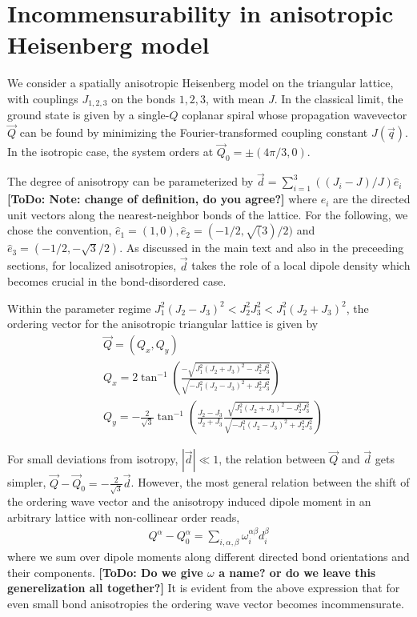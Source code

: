 \documentclass[twocolumn,english,aps,prl,floatfix]{revtex4-1}
\newcommand{\todo}[1]{{\color{red} {\bf [ToDo: #1]}}}
\begin{document}

\section{Incommensurability in anisotropic Heisenberg model}

We consider a spatially anisotropic Heisenberg model on the 
triangular lattice, with couplings $J_{1,2,3}$ on the bonds $1,2,3$, 
with mean $J$. In the classical limit, the ground state is given by 
a single-$Q$ coplanar spiral whose propagation wavevector $\vec Q$ 
can be found by minimizing the Fourier-transformed coupling constant 
$J({\vec q})$. In the isotropic case, the system orders at 
$\vec Q_0 = \pm (4\pi/3,0)$.

The degree of anisotropy can be parameterized by 
$\vec{d} = \sum_{i=1}^3 ((J_i-J)/J) \hat{e}_i$ 
\todo{Note: change of definition, do you agree?}
where $\hat{e}_i$ are the 
directed unit vectors along the nearest-neighbor bonds of the lattice.
For the following, we chose the convention, $\hat{e}_1=(1,0),
\hat{e}_2=(-1/2,\sqrt(3)/2)$ and $\hat{e}_3=(-1/2,-\sqrt{3}/2)$.
As discussed in the main text and also in the preceeding sections, 
for localized anisotropies, $\vec d$ takes the role of a local 
dipole density which becomes crucial in the bond-disordered case.

Within the parameter regime 
$J_1^2(J_2-J_3)^2<J_2^2J_3^2<J_1^2(J_2+J_3)^2$,
the ordering vector for the anisotropic triangular lattice is given by
\begin{equation}
    \begin{aligned}
        &\vec{Q} = (Q_x,Q_y) \\
        &Q_x = 2\tan^{-1}
        \left(\frac{-\sqrt{J_1^2(J_2+J_3)^2-J_2^2J_3^2}}
            {\sqrt{-J_1^2(J_2-J_3)^2+J_2^2J_3^2}}
        \right) \\
        &Q_y = -\frac{2}{\sqrt{3}}
        \tan^{-1}
        \left(\frac{J_2-J_3}{J_2+J_3}
            \frac{\sqrt{J_1^2(J_2+J_3)^2-J_2^2J_3^2}}
            {\sqrt{-J_1^2(J_2-J_3)^2+J_2^2J_3^2}}        
        \right)
    \end{aligned}
\end{equation}

For small deviations from isotropy, $|\vec d|\ll 1$, the relation 
between $\vec{Q}$ and $\vec d$ gets simpler, $\vec{Q}-\vec{Q}_0 
= -\frac{2}{\sqrt{3}}\vec{d}$. However, the most general relation 
between the shift of the ordering wave vector and the anisotropy 
induced dipole moment in an arbitrary lattice with non-collinear
order reads,
\begin{align}
    Q^\alpha-Q_0^\alpha = \sum_{i,\alpha,\beta}
    \omega_i^{\alpha\beta}d_i^\beta 
\end{align}
where we sum over dipole moments along different directed bond 
orientations and their components.
\todo{Do we give $\omega$ a name? or do we leave this generelization
all together?} It is evident from the above expression that
for even small bond anisotropies the ordering wave vector becomes
incommensurate. 
\end{document}
